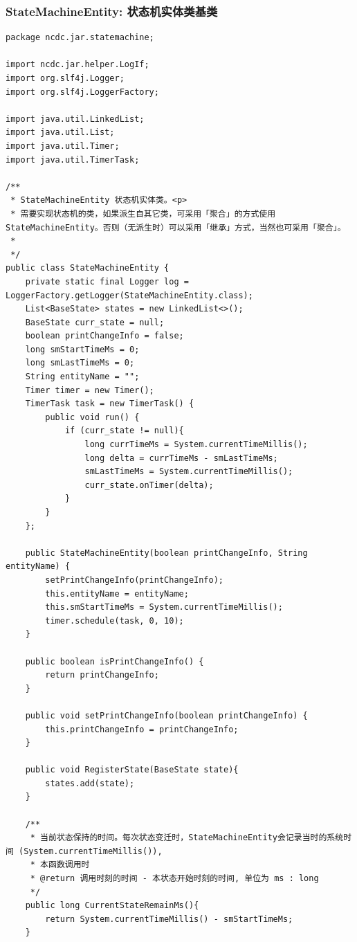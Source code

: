 \subsubsection{StateMachineEntity: 状态机实体类基类}
\begin{lstlisting}
package ncdc.jar.statemachine;

import ncdc.jar.helper.LogIf;
import org.slf4j.Logger;
import org.slf4j.LoggerFactory;

import java.util.LinkedList;
import java.util.List;
import java.util.Timer;
import java.util.TimerTask;

/**
 * StateMachineEntity 状态机实体类。<p>
 * 需要实现状态机的类，如果派生自其它类，可采用「聚合」的方式使用 StateMachineEntity。否则（无派生时）可以采用「继承」方式，当然也可采用「聚合」。
 *
 */
public class StateMachineEntity {
    private static final Logger log = LoggerFactory.getLogger(StateMachineEntity.class);
    List<BaseState> states = new LinkedList<>();
    BaseState curr_state = null;
	boolean printChangeInfo = false;
    long smStartTimeMs = 0;
    long smLastTimeMs = 0;
    String entityName = "";
    Timer timer = new Timer();
    TimerTask task = new TimerTask() {
        public void run() {
            if (curr_state != null){
                long currTimeMs = System.currentTimeMillis();
                long delta = currTimeMs - smLastTimeMs;
                smLastTimeMs = System.currentTimeMillis();
                curr_state.onTimer(delta);
            }
        }
    };

	public StateMachineEntity(boolean printChangeInfo, String entityName) {
		setPrintChangeInfo(printChangeInfo);
        this.entityName = entityName;
		this.smStartTimeMs = System.currentTimeMillis();
		timer.schedule(task, 0, 10);
	}

	public boolean isPrintChangeInfo() {
		return printChangeInfo;
	}

	public void setPrintChangeInfo(boolean printChangeInfo) {
		this.printChangeInfo = printChangeInfo;
	}

    public void RegisterState(BaseState state){
        states.add(state);
    }

    /**
     * 当前状态保持的时间。每次状态变迁时，StateMachineEntity会记录当时的系统时间 (System.currentTimeMillis()),
     * 本函数调用时
     * @return 调用时刻的时间 - 本状态开始时刻的时间, 单位为 ms : long
     */
    public long CurrentStateRemainMs(){
        return System.currentTimeMillis() - smStartTimeMs;
    }


\end{lstlisting}

